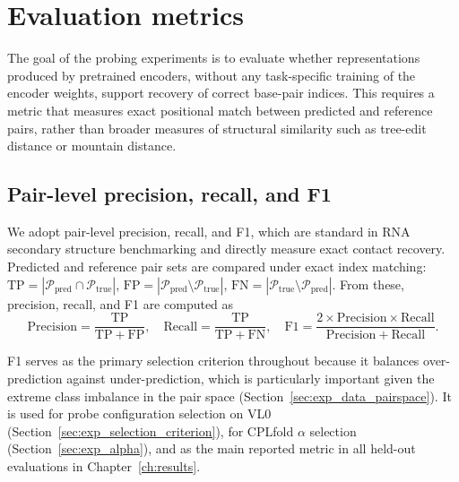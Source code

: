 \documentclass[logo,bsc,singlespacing,parskip]{infthesis}
\begin{document}
\section{Evaluation metrics}
\label{sec:methods_metrics}

The goal of the probing experiments is to evaluate whether representations produced by pretrained encoders, without any task-specific training of the
encoder weights, support recovery of correct base-pair indices. This requires a metric that measures exact positional match between predicted and reference pairs, rather than broader measures of structural similarity such as tree-edit distance or mountain distance.

\subsection{Pair-level precision, recall, and F1}
\label{sec:methods_metrics_f1}

We adopt pair-level precision, recall, and F1, which are standard in
RNA secondary structure benchmarking \citep{mathews2019benchmark} and
directly measure exact contact recovery. Predicted and reference pair
sets are compared under exact index matching:
$\mathrm{TP}=|\mathcal{P}_{\mathrm{pred}} \cap \mathcal{P}_{\mathrm{true}}|$,
$\mathrm{FP}=|\mathcal{P}_{\mathrm{pred}} \setminus \mathcal{P}_{\mathrm{true}}|$,
$\mathrm{FN}=|\mathcal{P}_{\mathrm{true}} \setminus \mathcal{P}_{\mathrm{pred}}|$.
From these, precision, recall, and F1 are computed as
\[
\mathrm{Precision}=\frac{\mathrm{TP}}{\mathrm{TP}+\mathrm{FP}}, \quad
\mathrm{Recall}=\frac{\mathrm{TP}}{\mathrm{TP}+\mathrm{FN}}, \quad
\mathrm{F1}=\frac{2 \times \mathrm{Precision} \times \mathrm{Recall}}{\mathrm{Precision}+\mathrm{Recall}}.
\]

F1 serves as the primary selection criterion throughout because it
balances over-prediction against under-prediction, which is
particularly important given the extreme class imbalance in the
pair space (Section~\ref{sec:exp_data_pairspace}).
It is used for probe configuration selection on VL0
(Section~\ref{sec:exp_selection_criterion}), for CPLfold $\alpha$
selection (Section~\ref{sec:exp_alpha}), and as the main reported
metric in all held-out evaluations in Chapter~\ref{ch:results}.
\end{document}
